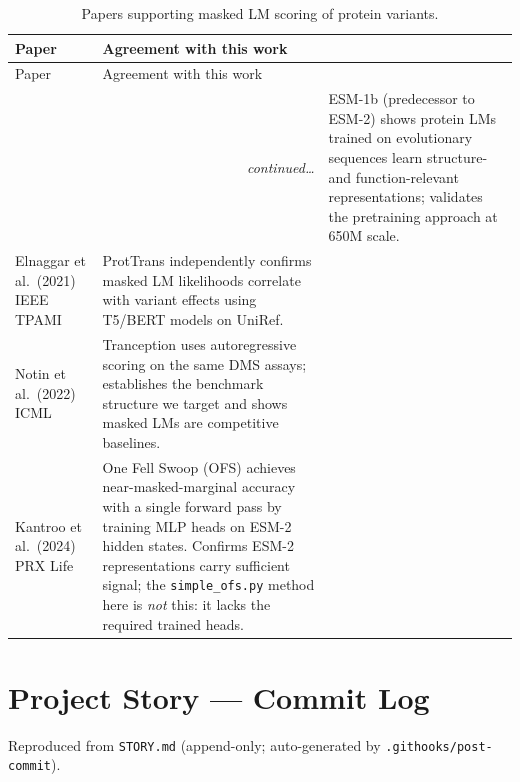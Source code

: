 \documentclass[11pt,a4paper]{article}
\begin{document}
\begin{longtable}{p{3.4cm}p{9.2cm}}
\caption{Papers supporting masked LM scoring of protein variants.}
\label{tab:related}\\
\toprule
Paper & Agreement with this work \\
\midrule
\endfirsthead
\toprule
Paper & Agreement with this work \\
\midrule
\endhead
\midrule\multicolumn{2}{r}{\small\itshape continued\ldots}
\endfoot
\bottomrule
\endlastfoot

Rives et al.\ (2021) PNAS~\cite{rives2021biological}
  & ESM-1b (predecessor to ESM-2) shows protein LMs trained on
    evolutionary sequences learn structure- and function-relevant
    representations; validates the pretraining approach at 650M scale. \\[4pt]

Elnaggar et al.\ (2021) IEEE TPAMI~\cite{elnaggar2021prottrans}
  & ProtTrans independently confirms masked LM likelihoods correlate
    with variant effects using T5/BERT models on UniRef. \\[4pt]

Notin et al.\ (2022) ICML~\cite{notin2022tranception}
  & Tranception uses autoregressive scoring on the same DMS assays;
    establishes the benchmark structure we target and shows masked LMs
    are competitive baselines. \\[4pt]

Kantroo et al.\ (2024) PRX Life~\cite{kantroo2024ofs}
  & One Fell Swoop (OFS) achieves near-masked-marginal accuracy with a
    single forward pass by training MLP heads on ESM-2 hidden states.
    Confirms ESM-2 representations carry sufficient signal; the
    \texttt{simple\_ofs.py} method here is \emph{not} this: it lacks
    the required trained heads. \\

\end{longtable}




\appendix

\section{Project Story — Commit Log}
\label{app:story}

Reproduced from \texttt{STORY.md} (append-only; auto-generated by
\texttt{.githooks/post-commit}).
\end{document}
